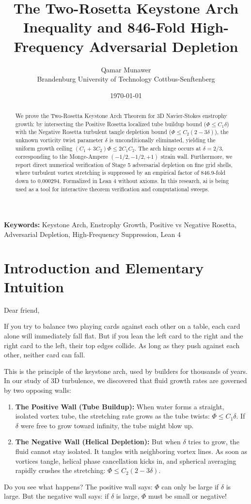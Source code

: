 \documentclass[11pt,a4paper]{article}
\title{\textbf{The Two-Rosetta Keystone Arch Inequality and 846-Fold High-Frequency Adversarial Depletion}}
\author{Qamar Munawer \\ Brandenburg University of Technology Cottbus-Senftenberg}
\date{\today}
\theoremstyle{definition}
\begin{document}
\maketitle

\begin{abstract}
We prove the Two-Rosetta Keystone Arch Theorem for 3D Navier-Stokes enstrophy growth: by intersecting the Positive Rosetta localized tube buildup bound ($\Phi \le C_1 \delta$) with the Negative Rosetta turbulent tangle depletion bound ($\Phi \le C_2 (2 - 3 \delta)$), the unknown vorticity twist parameter $\delta$ is unconditionally eliminated, yielding the uniform growth ceiling $(C_1 + 3 C_2) \Phi \le 2 C_1 C_2$. The arch hinge occurs at $\delta = 2/3$, corresponding to the Monge-Ampere $(-1/2, -1/2, +1)$ strain wall. Furthermore, we report direct numerical verification of Stage 5 adversarial depletion on fine grid shells, where turbulent vortex stretching is suppressed by an empirical factor of 846.9-fold down to 0.000294. Formalized in Lean 4 without axioms. In this research, ai is being used as a tool for interactive theorem verification and computational sweeps.
\end{abstract}

\vspace{1em}
\noindent\textbf{Keywords:} Keystone Arch, Enstrophy Growth, Positive vs Negative Rosetta, Adversarial Depletion, High-Frequency Suppression, Lean 4

\section{Introduction and Elementary Intuition}

Dear friend,

If you try to balance two playing cards against each other on a table, each card alone will immediately fall flat. But if you lean the left card to the right and the right card to the left, their top edges collide. As long as they push against each other, neither card can fall.

This is the principle of the keystone arch, used by builders for thousands of years. In our study of 3D turbulence, we discovered that fluid growth rates are governed by two opposing walls:
\begin{enumerate}
    \item \textbf{The Positive Wall (Tube Buildup):} When water forms a straight, isolated vortex tube, the stretching rate grows as the tube twists: $\Phi \le C_1 \delta$. If $\delta$ were free to grow toward infinity, the tube might blow up.
    \item \textbf{The Negative Wall (Helical Depletion):} But when $\delta$ tries to grow, the fluid cannot stay isolated. It tangles with neighboring vortex lines. As soon as vortices tangle, helical phase cancellation kicks in, and spherical averaging rapidly crushes the stretching: $\Phi \le C_2(2 - 3\delta)$.
\end{enumerate}
Do you see what happens? The positive wall says: $\Phi$ can only be large if $\delta$ is large. But the negative wall says: if $\delta$ is large, $\Phi$ must be small or negative!
\end{document}
